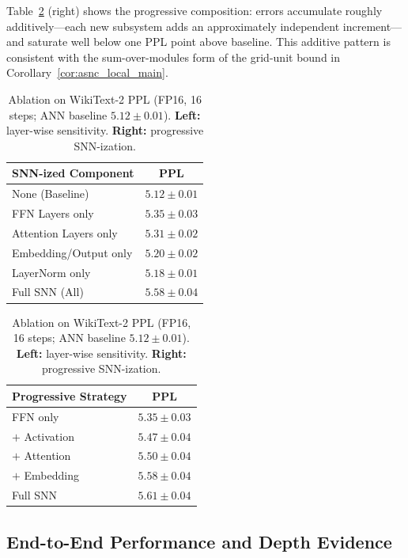 \documentclass{article}
\theoremstyle{plain}
\theoremstyle{definition}
\theoremstyle{remark}
\begin{document}
Table~\ref{tab:ablation} (right) shows the progressive composition: errors
accumulate roughly additively---each new subsystem adds an approximately
independent increment---and saturate well below one PPL point above baseline.
This additive pattern is consistent with the sum-over-modules form of the
grid-unit bound in Corollary~\ref{cor:asnc_local_main}.

\begin{table}[h!]
\centering
\caption{Ablation on WikiText-2 PPL (FP16, 16 steps; ANN baseline $5.12 \pm 0.01$).
\textbf{Left:} layer-wise sensitivity. \textbf{Right:} progressive SNN-ization.}
\label{tab:ablation}
\vspace{0.4em}
\begin{minipage}[t]{0.48\textwidth}
\centering
\small
\begin{tabular}{lc}
\toprule
\textbf{SNN-ized Component} & \textbf{PPL} \\
\midrule
None (Baseline)           & $5.12 \pm 0.01$ \\
FFN Layers only           & $5.35 \pm 0.03$ \\
Attention Layers only     & $5.31 \pm 0.02$ \\
Embedding/Output only     & $5.20 \pm 0.02$ \\
LayerNorm only            & $5.18 \pm 0.01$ \\
Full SNN (All)            & $5.58 \pm 0.04$ \\
\bottomrule
\end{tabular}
\end{minipage}
\hfill
\begin{minipage}[t]{0.48\textwidth}
\centering
\small
\begin{tabular}{lc}
\toprule
\textbf{Progressive Strategy} & \textbf{PPL} \\
\midrule
FFN only                & $5.35 \pm 0.03$ \\
$+$ Activation          & $5.47 \pm 0.04$ \\
$+$ Attention           & $5.50 \pm 0.04$ \\
$+$ Embedding           & $5.58 \pm 0.04$ \\
Full SNN                & $5.61 \pm 0.04$ \\
\bottomrule
\end{tabular}
\end{minipage}
\end{table}


\subsection{End-to-End Performance and Depth Evidence}
\label{subsec:exp_scale}
\end{document}
